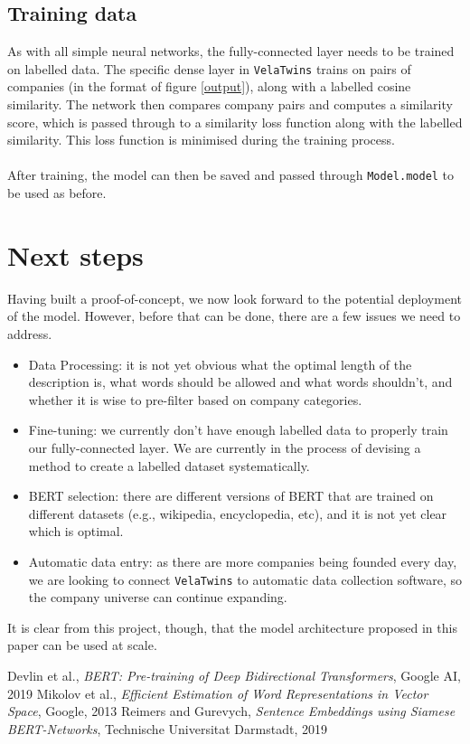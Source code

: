 \documentclass[a4paper]{article}
\begin{document}
\subsection{Training data}\label{trainingdata}
As with all simple neural networks, the fully-connected layer needs to be
trained on labelled data. The specific dense layer in \lstinline{VelaTwins}
trains on pairs of companies (in the format of figure \ref{output}), along with
a labelled cosine similarity. The network then compares company pairs and computes a
similarity score, which is passed through to a similarity loss function along
with the labelled similarity. This loss function is minimised during the
training process. \\\\After training, the model can then be saved and passed
through \lstinline{Model.model} to be used as before.
\section{Next steps}
Having built a proof-of-concept, we now look forward to the potential deployment of
the model. However, before that can be done, there are a few issues we need to
address.
\begin{itemize} 
    \item Data Processing: it is not yet obvious what the optimal
    length of the description is, what words should be allowed and what words
    shouldn't, and whether it is wise to pre-filter based on company categories.
    \item Fine-tuning: we currently don't have enough labelled data to properly
    train our fully-connected layer. We are currently in the process of devising
    a method to create a labelled dataset systematically. 
    \item BERT selection: there are different versions of BERT that are trained
    on different datasets (e.g., wikipedia, encyclopedia, etc), and it is not
    yet clear which is optimal.
    \item Automatic data entry: as there are more companies being founded every
    day, we are looking to connect \lstinline{VelaTwins} to automatic data
    collection software, so the company universe can continue expanding.
\end{itemize}

It is clear from this project, though, that the model architecture proposed in
this paper can be used at scale.

\clearpage
\begin{thebibliography}{9}
Devlin et al., \emph{BERT: Pre-training of Deep Bidirectional
Transformers}, Google AI,
2019\label{BERTpaper} 
Mikolov et al., \emph{Efficient Estimation of Word Representations in Vector Space}, Google,
2013\label{word2vecpaper} 
Reimers and Gurevych, \emph{Sentence Embeddings using Siamese BERT-Networks}, Technische Universitat Darmstadt,
2019\label{sbertpaper} 
\end{thebibliography}


\appendix
\renewcommand\thesection{Appendix \Alph{section}}
\end{document}

